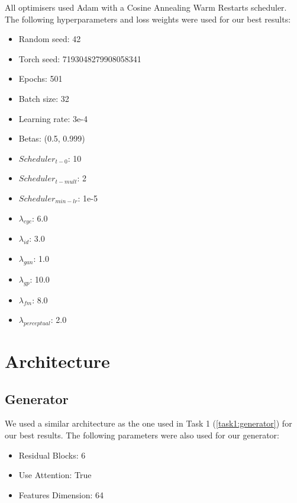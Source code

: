 \documentclass[twoside,english,notitlepage]{report}
\begin{document}
All optimisers used Adam with a Cosine Annealing Warm Restarts scheduler. The following hyperparameters and loss weights were used for our best results:

\begin{multicols}{3}
    \begin{itemize}
        \item Random seed: 42
        \item Torch seed: 7193048279908058341
        \item Epochs: 501
        \item Batch size: 32
        \item Learning rate: 3e-4
        \item Betas: (0.5, 0.999)
        \item $Scheduler_{t-0}$: 10
        \item $Scheduler_{t-mult}$: 2
        \item $Scheduler_{min-lr}$: 1e-5
        \item $\lambda_{cyc}$: 6.0
        \item $\lambda_{id}$: 3.0
        \item $\lambda_{gan}$: 1.0
        \item $\lambda_{gp}$: 10.0
        \item $\lambda_{fm}$: 8.0
        \item $\lambda_{perceptual}$: 2.0
    \end{itemize}
\end{multicols}



\section{Architecture}
\subsection{Generator}\label{task2:generator}
We used a similar architecture as the one used in Task 1 (\ref{task1:generator}) for our best results. The following parameters were also used for our generator:

\begin{multicols}{3}
    \begin{itemize}
        \item Residual Blocks: 6
        \item Use Attention: True
        \item Features Dimension: 64
    \end{itemize}
\end{multicols}
\end{document}
